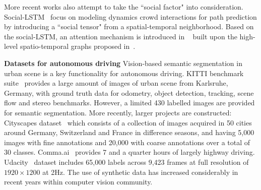 \documentclass[10pt,twocolumn,letterpaper]{article}
\begin{document}
More recent works also attempt to take the ``social factor" into consideration. Social-LSTM~\cite{alahi2016social} focus on modeling dynamics crowd interactions for path prediction by introducing a ``social tensor" from a spatial-temporal neighborhood. Based on the social-LSTM, an attention mechanism is introduced in ~\cite{social_lstm_2018} built upon the high-level spatio-temporal graphs proposed in~\cite{jain2016structural}.


\noindent \textbf{Datasets for autonomous driving} Vision-based semantic segmentation in urban scene is a key functionality for autonomous driving.
KITTI benchmark suite~\cite{Geiger2013IJRR} provides a large amount of images of urban scene from Karlsruhe, Germany, with ground truth data for odometry, object detection, tracking, scene flow and stereo benchmarks. However, a limited 430 labelled images are provided for semantic segmentation.
More recently, larger projects are constructed:
Cityscapes dataset~\cite{Cordts2016Cityscapes} which consists of a collection of images acquired in 50 cities around Germany, Switzerland and France in difference seasons, and having 5,000 images with fine annotations and 20,000 with coarse annotations over a total of 30 classes. Comma.ai~\cite{santana2016learning} provides 7 and a quarter hours of largely highway driving. Udacity~\cite{udacity} dataset includes 65,000 labels across 9,423 frames at full resolution of $1920\times1200$ at 2Hz.
The use of synthetic data has increased considerably in recent years within computer vision community.
\end{document}
